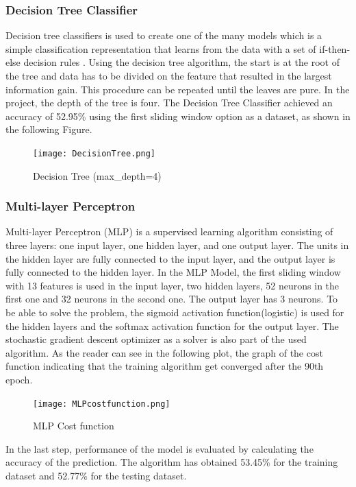 \subsubsection{Decision Tree Classifier}

Decision tree classifiers is used to create one of the many models which is a simple classification representation that learns from the data with a set of if-then-else decision rules \cite{DecisionTree:scikit-learn}. \newline 
Using the decision tree algorithm, the start is at the root of the tree and data has to be divided on the feature that resulted in the largest information gain. This procedure can be repeated until the leaves are pure.\newline \newline
In the project, the depth of the tree is four.\newline
The Decision Tree Classifier achieved an accuracy of 52.95\% using the first sliding window option as a dataset, as shown in the following Figure.
\begin{figure}[H]
\begin{center}
\texttt{[image: DecisionTree.png]}
\end{center}
\caption{Decision Tree (max\_depth=4)}
\label{fig:DecisionTree}
\end{figure}


\subsubsection{Multi-layer Perceptron}

Multi-layer Perceptron (MLP) is a supervised learning algorithm consisting of three layers: one input layer, one hidden layer, and one output layer. The units in the hidden layer are fully connected to the input layer, and the output layer is fully connected to the hidden layer\cite{PythonMachineLearning}. \newline
In the MLP Model, the first sliding window with 13 features is used in the input layer, two hidden layers, 52 neurons in the first one and 32 neurons in the second one. The output layer has 3 neurons.\newline \newline 
To be able to solve the problem, the sigmoid activation function(logistic) is used for the hidden layers and the softmax activation function for the output layer. The stochastic gradient descent optimizer as a solver is also part of the used algorithm. \newline 
As the reader can see in the following plot, the graph of the cost function indicating that the training algorithm get converged after the 90th epoch. \newline
\begin{figure}[H]
\begin{center}
\texttt{[image: MLPcostfunction.png]}
\end{center}
\caption{MLP Cost function}
\label{fig:MLPcostfunction}
\end{figure}
In the last step, performance of the model is evaluated by calculating the accuracy of the prediction. The algorithm has obtained 53.45\% for the training dataset and 52.77\% for the testing dataset.


